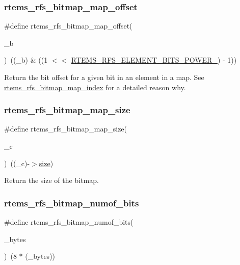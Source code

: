 \subsubsection{\texorpdfstring{rtems\_rfs\_bitmap\_map\_offset}{rtems\_rfs\_bitmap\_map\_offset}}
{\footnotesize\ttfamily \#define rtems\+\_\+rfs\+\_\+bitmap\+\_\+map\+\_\+offset(\begin{DoxyParamCaption}\item[{}]{\+\_\+b }\end{DoxyParamCaption})~((\+\_\+b) \& ((1 $<$$<$ \mbox{\hyperlink{rtems-rfs-bitmaps_8h_a50825eb249f04b99969055b75f2da875}{R\+T\+E\+M\+S\+\_\+\+R\+F\+S\+\_\+\+E\+L\+E\+M\+E\+N\+T\+\_\+\+B\+I\+T\+S\+\_\+\+P\+O\+W\+E\+R\+\_}}) -\/ 1))}

Return the bit offset for a given bit in an element in a map. See \mbox{\hyperlink{rtems-rfs-bitmaps_8h_a6becee21763009245244280533e33637}{rtems\+\_\+rfs\+\_\+bitmap\+\_\+map\+\_\+index}} for a detailed reason why. \mbox{\label{rtems-rfs-bitmaps_8h_a9d70bc8a3baca07f39595769270f7ecb}} 
\subsubsection{\texorpdfstring{rtems\_rfs\_bitmap\_map\_size}{rtems\_rfs\_bitmap\_map\_size}}
{\footnotesize\ttfamily \#define rtems\+\_\+rfs\+\_\+bitmap\+\_\+map\+\_\+size(\begin{DoxyParamCaption}\item[{}]{\+\_\+c }\end{DoxyParamCaption})~((\+\_\+c)-\/$>$\mbox{\hyperlink{sun4u_2tte_8h_a245260f6f74972558f61b85227df5aae}{size}})}

Return the size of the bitmap. \mbox{\label{rtems-rfs-bitmaps_8h_a789a8cd5be87a1954942fc26a9e928c0}} 
\subsubsection{\texorpdfstring{rtems\_rfs\_bitmap\_numof\_bits}{rtems\_rfs\_bitmap\_numof\_bits}}
{\footnotesize\ttfamily \#define rtems\+\_\+rfs\+\_\+bitmap\+\_\+numof\+\_\+bits(\begin{DoxyParamCaption}\item[{}]{\+\_\+bytes }\end{DoxyParamCaption})~(8 $\ast$ (\+\_\+bytes))}

